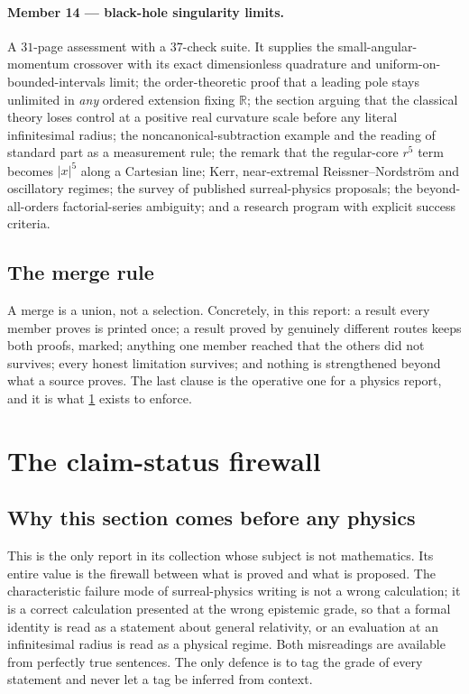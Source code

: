 \documentclass[11pt,letterpaper]{article}
\numberwithin{equation}{section}
\theoremstyle{definition}
\theoremstyle{remark}
\newcommand{\R}{\mathbb R}
\newcommand{\abs}[1]{\lvert#1\rvert}
\begin{document}
\paragraph{Member 14 --- black-hole singularity limits.}
A $31$-page assessment with a $37$-check suite. It supplies the
small-angular-momentum crossover with its exact dimensionless quadrature and
uniform-on-bounded-intervals limit; the order-theoretic proof that a leading
pole stays unlimited in \emph{any} ordered extension fixing $\R$; the section
arguing that the classical theory loses control at a positive real curvature
scale before any literal infinitesimal radius; the noncanonical-subtraction
example and the reading of standard part as a measurement rule; the remark that
the regular-core $r^{5}$ term becomes $\abs{x}^{5}$ along a Cartesian line;
Kerr, near-extremal Reissner--Nordstr\"om and oscillatory regimes; the survey of
published surreal-physics proposals; the beyond-all-orders factorial-series
ambiguity; and a research program with explicit success criteria.

\subsection{The merge rule}
\label{phys:sub:mergerule}

A merge is a union, not a selection. Concretely, in this report: a result every
member proves is printed once; a result proved by genuinely different routes
keeps both proofs, marked; anything one member reached that the others did not
survives; every honest limitation survives; and nothing is strengthened beyond
what a source proves. The last clause is the operative one for a physics
report, and it is what \cref{phys:sec:firewall} exists to enforce.

\section{The claim-status firewall}
\label{phys:sec:firewall}

\subsection{Why this section comes before any physics}
\label{phys:sub:whyfirewall}

This is the only report in its collection whose subject is not mathematics.
Its entire value is the firewall between what is proved and what is proposed.
The characteristic failure mode of surreal-physics writing is not a wrong
calculation; it is a correct calculation presented at the wrong epistemic
grade, so that a formal identity is read as a statement about general
relativity, or an evaluation at an infinitesimal radius is read as a physical
regime. Both misreadings are available from perfectly true sentences. The only
defence is to tag the grade of every statement and never let a tag be inferred
from context.
\end{document}
